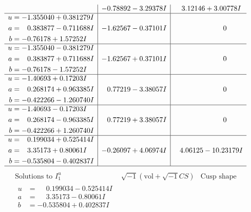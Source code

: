 \documentclass[1p]{elsarticle_modified}
\theoremstyle{definition}
\newcommand{\I}{\sqrt{-1}}
\begin{document}
$$\begin{array}{c|c|c}
 & -0.78892 - 3.29378 I & \phantom{-}3.12146 + 3.00778 I \\ \hline\begin{aligned}
u &= -1.355040 + 0.381279 I \\
a &= \phantom{-}0.383877 - 0.711688 I \\
b &= -0.76178 + 1.57252 I\end{aligned}
 & -1.62567 - 0.37101 I & \phantom{-0.000000 } 0 \\ \hline\begin{aligned}
u &= -1.355040 - 0.381279 I \\
a &= \phantom{-}0.383877 + 0.711688 I \\
b &= -0.76178 - 1.57252 I\end{aligned}
 & -1.62567 + 0.37101 I & \phantom{-0.000000 } 0 \\ \hline\begin{aligned}
u &= -1.40693 + 0.17203 I \\
a &= \phantom{-}0.268174 + 0.963385 I \\
b &= -0.422266 - 1.260740 I\end{aligned}
 & \phantom{-}0.77219 - 3.38057 I & \phantom{-0.000000 } 0 \\ \hline\begin{aligned}
u &= -1.40693 - 0.17203 I \\
a &= \phantom{-}0.268174 - 0.963385 I \\
b &= -0.422266 + 1.260740 I\end{aligned}
 & \phantom{-}0.77219 + 3.38057 I & \phantom{-0.000000 } 0 \\ \hline\begin{aligned}
u &= \phantom{-}0.199034 + 0.525414 I \\
a &= \phantom{-}3.35173 + 0.80061 I \\
b &= -0.535804 - 0.402837 I\end{aligned}
 & -0.26097 + 4.06974 I & \phantom{-}4.06125 - 10.23179 I\\
 \hline 
 \end{array}$$\newpage$$\begin{array}{c|c|c}  
\text{Solutions to }I^u_{1}& \I (\text{vol} + \sqrt{-1}CS) & \text{Cusp shape}\\
 \hline 
\begin{aligned}
u &= \phantom{-}0.199034 - 0.525414 I \\
a &= \phantom{-}3.35173 - 0.80061 I \\
b &= -0.535804 + 0.402837 I\end{aligned}

\end{array}$$
\end{document}
